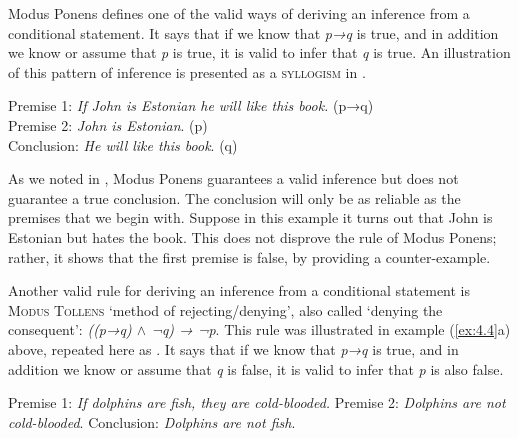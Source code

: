 
Modus Ponens defines one of the valid ways of deriving an inference from a conditional statement. It says that if we know that \textit{p→q} is true, and in addition we know or assume that \textit{p} is true, it is valid to infer that \textit{q} is true. An illustration of this pattern of inference is presented as a \textsc{syllogism} in .


\ea \label{ex:4.17}
Premise 1: \textit{If John is Estonian he will like this book.}  (p→q)\\
Premise 2: \textit{John is Estonian}.   (p)\\
\FelixHRule
Conclusion: \textit{He will like this book}.   (q)
\z


As we noted in , Modus Ponens guarantees a valid inference but does not guarantee a true conclusion. The conclusion will only be as reliable as the premises that we begin with. Suppose in this example it turns out that John is Estonian but hates the book. This does not disprove the rule of Modus Ponens; rather, it shows that the first premise is false, by providing a counter-example.



Another valid rule for deriving an inference from a conditional statement is \textsc{Modus Tollens} ‘method of rejecting/denying’, also called ‘denying the consequent’: \textit{((p→q) $\wedge$ ¬q) → ¬p}. This rule was illustrated in example (\ref{ex:4.4}a) above, repeated here as . It says that if we know that \textit{p→q} is true, and in addition we know or assume that \textit{q} is false, it is valid to infer that \textit{p} is also false.

\settowidth{}
\ea \label{ex:4.18}
Premise 1: \textit{If dolphins are fish, they are cold-blooded.} 
Premise 2: \textit{Dolphins are not cold-blooded}.   
\FelixHRule
Conclusion: \textit{Dolphins are not fish}.   
\z


